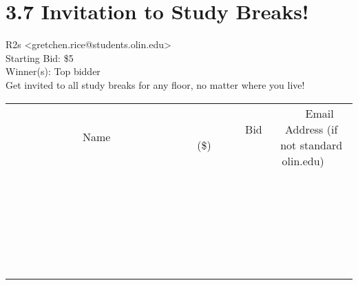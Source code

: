 \documentclass[11pt]{article}
\begin{document}
					\section*{3.7 Invitation to Study Breaks!}
					R2s <gretchen.rice@students.olin.edu> \\
					Starting Bid: \$5 \\
					Winner(s): Top bidder \\
					Get invited to all study breaks for any floor, no matter where you live! \\
					[6ex]
					\begin{tabular}{c c c}
						~~~~~~~~~~~~~Name~~~~~~~~~~~~~ & ~~~~~~~~~Bid (\$)~~~~~~~~~ & ~~~Email Address (if not standard olin.edu)~~~ \\
				
 & & \\
\hline
 & & \\
\hline
 & & \\
\hline
 & & \\
\hline
 & & \\
\hline
 & & \\
\hline
 & & \\
\hline
 & & \\
\hline
 & & \\
\hline
 & & \\
\hline
 & & \\
\hline
 & & \\
\hline
 & & \\
\hline
 & & \\
\hline
 & & \\
\hline
 & & \\
\hline
 & & \\
\hline
 & & \\
\hline
 & & \\
\hline
 & & \\
\hline
 & & \\
\hline
 & & \\
\hline
 & & \\
\hline
 & & \\
\hline
 & & \\
\hline
 & & \\
\hline
					\end{tabular}
					\clearpage
				
\end{document}
